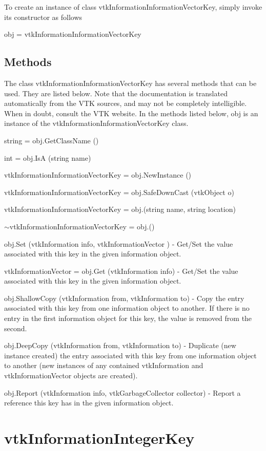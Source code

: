 To create an instance of class vtk\-Information\-Information\-Vector\-Key, simply invoke its constructor as follows \begin{DoxyVerb}  obj = vtkInformationInformationVectorKey
\end{DoxyVerb}
 \hypertarget{vtkwidgets_vtkxyplotwidget_Methods}{}\subsection{Methods}\label{vtkwidgets_vtkxyplotwidget_Methods}
The class vtk\-Information\-Information\-Vector\-Key has several methods that can be used. They are listed below. Note that the documentation is translated automatically from the V\-T\-K sources, and may not be completely intelligible. When in doubt, consult the V\-T\-K website. In the methods listed below, {\ttfamily obj} is an instance of the vtk\-Information\-Information\-Vector\-Key class. 
\begin{DoxyItemize}
\item {\ttfamily string = obj.\-Get\-Class\-Name ()}  
\item {\ttfamily int = obj.\-Is\-A (string name)}  
\item {\ttfamily vtk\-Information\-Information\-Vector\-Key = obj.\-New\-Instance ()}  
\item {\ttfamily vtk\-Information\-Information\-Vector\-Key = obj.\-Safe\-Down\-Cast (vtk\-Object o)}  
\item {\ttfamily vtk\-Information\-Information\-Vector\-Key = obj.(string name, string location)}  
\item {\ttfamily $\sim$vtk\-Information\-Information\-Vector\-Key = obj.()}  
\item {\ttfamily obj.\-Set (vtk\-Information info, vtk\-Information\-Vector )} -\/ Get/\-Set the value associated with this key in the given information object.  
\item {\ttfamily vtk\-Information\-Vector = obj.\-Get (vtk\-Information info)} -\/ Get/\-Set the value associated with this key in the given information object.  
\item {\ttfamily obj.\-Shallow\-Copy (vtk\-Information from, vtk\-Information to)} -\/ Copy the entry associated with this key from one information object to another. If there is no entry in the first information object for this key, the value is removed from the second.  
\item {\ttfamily obj.\-Deep\-Copy (vtk\-Information from, vtk\-Information to)} -\/ Duplicate (new instance created) the entry associated with this key from one information object to another (new instances of any contained vtk\-Information and vtk\-Information\-Vector objects are created).  
\item {\ttfamily obj.\-Report (vtk\-Information info, vtk\-Garbage\-Collector collector)} -\/ Report a reference this key has in the given information object.  
\end{DoxyItemize}\hypertarget{vtkcommon_vtkinformationintegerkey}{}\section{vtk\-Information\-Integer\-Key}\label{vtkcommon_vtkinformationintegerkey}
